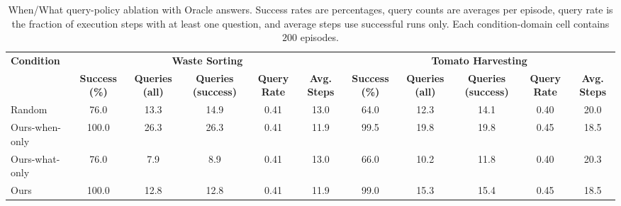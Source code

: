 \begin{table}[t]
\centering
\caption{When/What query-policy ablation with Oracle answers. Success rates are percentages, query counts are averages per episode, query rate is the fraction of execution steps with at least one question, and average steps use successful runs only. Each condition-domain cell contains $200$ episodes.}
\label{tab:when_what_ablation}
\footnotesize
\setlength{\tabcolsep}{2pt}
\begin{tabular*}{\textwidth}{@{\extracolsep{\fill}}lcccccccccc}
\toprule
\multirow{2}{*}{\textbf{Condition}} & \multicolumn{5}{c}{\textbf{Waste Sorting}} & \multicolumn{5}{c}{\textbf{Tomato Harvesting}} \\
\cmidrule(lr){2-6}\cmidrule(lr){7-11}
& \textbf{Success (\%)} & \textbf{Queries (all)} & \textbf{Queries (success)} & \textbf{Query Rate} & \textbf{Avg. Steps} & \textbf{Success (\%)} & \textbf{Queries (all)} & \textbf{Queries (success)} & \textbf{Query Rate} & \textbf{Avg. Steps} \\
\midrule
Random & 76.0 & 13.3 & 14.9 & 0.41 & 13.0 & 64.0 & 12.3 & 14.1 & 0.40 & 20.0 \\
Ours-when-only & 100.0 & 26.3 & 26.3 & 0.41 & 11.9 & 99.5 & 19.8 & 19.8 & 0.45 & 18.5 \\
Ours-what-only & 76.0 & 7.9 & 8.9 & 0.41 & 13.0 & 66.0 & 10.2 & 11.8 & 0.40 & 20.3 \\
Ours & 100.0 & 12.8 & 12.8 & 0.41 & 11.9 & 99.0 & 15.3 & 15.4 & 0.45 & 18.5 \\
\bottomrule
\end{tabular*}
\end{table}
